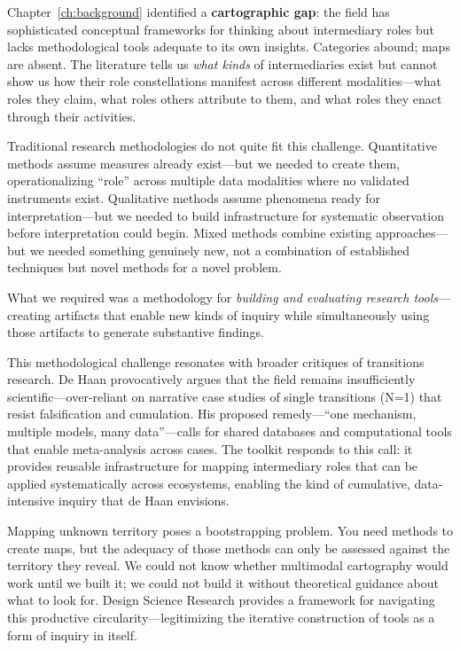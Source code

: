 \documentclass[../main.tex]{subfiles}
\begin{document}
Chapter~\ref{ch:background} identified a \textbf{cartographic gap}: the field has sophisticated conceptual frameworks for thinking about intermediary roles but lacks methodological tools adequate to its own insights. Categories abound; maps are absent. The literature tells us \emph{what kinds} of intermediaries exist but cannot show us how their role constellations manifest across different modalities---what roles they claim, what roles others attribute to them, and what roles they enact through their activities.

Traditional research methodologies do not quite fit this challenge. Quantitative methods assume measures already exist---but we needed to create them, operationalizing ``role'' across multiple data modalities where no validated instruments exist. Qualitative methods assume phenomena ready for interpretation---but we needed to build infrastructure for systematic observation before interpretation could begin. Mixed methods combine existing approaches---but we needed something genuinely new, not a combination of established techniques but novel methods for a novel problem.

What we required was a methodology for \textit{building and evaluating research tools}---creating artifacts that enable new kinds of inquiry while simultaneously using those artifacts to generate substantive findings.

This methodological challenge resonates with broader critiques of transitions research. De Haan \citeyear{dehaan2025makingscience} provocatively argues that the field remains insufficiently scientific---over-reliant on narrative case studies of single transitions (N=1) that resist falsification and cumulation. His proposed remedy---``one mechanism, multiple models, many data''---calls for shared databases and computational tools that enable meta-analysis across cases. The \RoleBox{} toolkit responds to this call: it provides reusable infrastructure for mapping intermediary roles that can be applied systematically across ecosystems, enabling the kind of cumulative, data-intensive inquiry that de Haan envisions.

\begin{insightbox}
Mapping unknown territory poses a bootstrapping problem. You need methods to create maps, but the adequacy of those methods can only be assessed against the territory they reveal. We could not know whether multimodal cartography would work until we built it; we could not build it without theoretical guidance about what to look for. Design Science Research provides a framework for navigating this productive circularity---legitimizing the iterative construction of tools as a form of inquiry in itself.
\end{insightbox}
\end{document}
